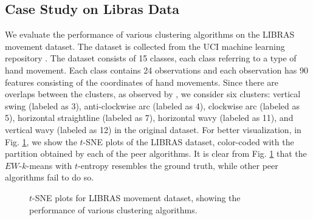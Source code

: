 \documentclass{article}
\begin{document}
 \subsection{Case Study on Libras Data}
 We evaluate the performance of various clustering algorithms on the LIBRAS movement dataset. The dataset is collected from the UCI machine learning repository \citep{Dua:2019}. The dataset consists of 15 classes, each class referring to a type of hand movement. Each class contains 24 observations and each observation has 90 features consisting of the coordinates of hand movements. Since there are overlaps between the clusters, as observed by \cite{wang2018sparse}, we consider six clusters: vertical swing (labeled as 3), anti-clockwise arc (labeled as 4), clockwise arc (labeled as 5), horizontal straightline (labeled as 7), horizontal wavy (labeled as 11), and vertical wavy  (labeled as 12) in the original dataset.
 For better visualization, in Fig. \ref{fig_cluster}, we show the $t$-SNE plots \citep{maaten2008visualizing} of the LIBRAS dataset, color-coded with the partition obtained by each of the peer algorithms. It is clear from Fig. \ref{fig_cluster} that the $EW$-$k$-means with $t$-entropy resembles the ground truth, while other peer algorithms fail to do so.
 \begin{figure}[ht]
\centering
{}
\hfil
{}
\hfil
{}
\hfil
{}
\hfil
{}
\hfil
{}
\hfil
\centering
\caption{$t$-SNE plots for LIBRAS movement dataset, showing the performance of various clustering algorithms.}
\label{fig_cluster}
\end{figure}
\end{document}
